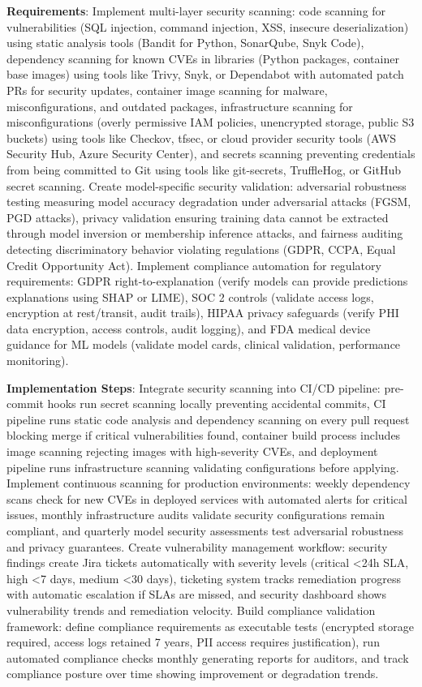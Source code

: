 \textbf{Requirements}: Implement multi-layer security scanning: code scanning for vulnerabilities (SQL injection, command injection, XSS, insecure deserialization) using static analysis tools (Bandit for Python, SonarQube, Snyk Code), dependency scanning for known CVEs in libraries (Python packages, container base images) using tools like Trivy, Snyk, or Dependabot with automated patch PRs for security updates, container image scanning for malware, misconfigurations, and outdated packages, infrastructure scanning for misconfigurations (overly permissive IAM policies, unencrypted storage, public S3 buckets) using tools like Checkov, tfsec, or cloud provider security tools (AWS Security Hub, Azure Security Center), and secrets scanning preventing credentials from being committed to Git using tools like git-secrets, TruffleHog, or GitHub secret scanning. Create model-specific security validation: adversarial robustness testing measuring model accuracy degradation under adversarial attacks (FGSM, PGD attacks), privacy validation ensuring training data cannot be extracted through model inversion or membership inference attacks, and fairness auditing detecting discriminatory behavior violating regulations (GDPR, CCPA, Equal Credit Opportunity Act). Implement compliance automation for regulatory requirements: GDPR right-to-explanation (verify models can provide predictions explanations using SHAP or LIME), SOC 2 controls (validate access logs, encryption at rest/transit, audit trails), HIPAA privacy safeguards (verify PHI data encryption, access controls, audit logging), and FDA medical device guidance for ML models (validate model cards, clinical validation, performance monitoring).

\textbf{Implementation Steps}: Integrate security scanning into CI/CD pipeline: pre-commit hooks run secret scanning locally preventing accidental commits, CI pipeline runs static code analysis and dependency scanning on every pull request blocking merge if critical vulnerabilities found, container build process includes image scanning rejecting images with high-severity CVEs, and deployment pipeline runs infrastructure scanning validating configurations before applying. Implement continuous scanning for production environments: weekly dependency scans check for new CVEs in deployed services with automated alerts for critical issues, monthly infrastructure audits validate security configurations remain compliant, and quarterly model security assessments test adversarial robustness and privacy guarantees. Create vulnerability management workflow: security findings create Jira tickets automatically with severity levels (critical <24h SLA, high <7 days, medium <30 days), ticketing system tracks remediation progress with automatic escalation if SLAs are missed, and security dashboard shows vulnerability trends and remediation velocity. Build compliance validation framework: define compliance requirements as executable tests (encrypted storage required, access logs retained 7 years, PII access requires justification), run automated compliance checks monthly generating reports for auditors, and track compliance posture over time showing improvement or degradation trends.

